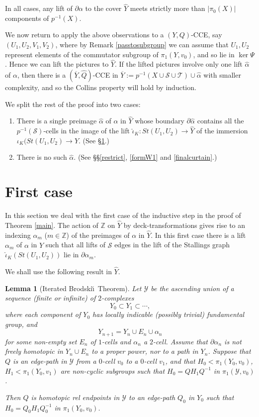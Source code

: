 \documentclass[12pt,a4paper]{amsart}
\def\Z{\mathbb{Z}}
\def\ol{\overline}
\def\wh{\widehat}
\def\a{\alpha}
\def\cS{\mathcal{S}}
\def\cT{\mathcal{T}}
\newtheorem{lem}[thm]{Lemma}
\begin{document}
  
In all cases, any lift of $\partial\a$ to the cover $\wh Y$ meets strictly more
than $\vert\pi_0(X)\vert$ components of $p^{-1}(X)$. 

\bigskip 
We now return to
apply the above observations to a $(Y,Q)$-CCE, say $(U_1,U_2,V_1,V_2)$,
where by Remark \ref{passtosubgroup} we can assume that $U_1,U_2$ 
represent elements of the commutator subgroup of $\pi_1(Y,v_0)$,
and so  lie in $\ker\Psi$.  
Hence we can 
 lift the pictures to $\wh Y$.  If
the lifted pictures involve only one lift $\wh\a$ of $\alpha$, 
then there is a $(\ol Y, \wh Q)$-CCE  in $\ol{Y}:=p^{-1}(X\cup\cS\cup\cT)\cup\wh\a$ with smaller complexity, and so the Collins 
property will hold by induction. 

 We split the rest of the proof into two cases:
\begin{enumerate}
\item There is a single preimage $\wh\a$ of $\a$ in $\wh Y$ whose boundary $\partial\wh\a$ contains all the $p^{-1}(\cS)$-cells in the image of the lift $\wh\iota_K:St(U_1,U_2)\to\wh Y$ of the immersion $\iota_K(St(U_1,U_2)\to Y$.  (See \S \ref{first}.)
\item There is no such $\wh\a$. (See \S\S \ref{restrict}, \ref{formW1} and \ref{finalcurtain}.)
\end{enumerate}


\section{First case}\label{first}

In this section we deal with the 
 first case of the inductive step in the proof of Theorem \ref{main}.
The action of $\Z$ on $\wh Y$ by deck-transformations 
gives rise to an indexing $\a_m$ ($m\in\Z$) of the preimages of $\a$ in $\wh{Y}$.  
In this first case
there is a lift $\a_m$ of  $\alpha$ 
in $\wh Y$ such that 
	all lifts of $\cS$ edges in the lift of the Stallings graph $\wh\iota_K(St(U_1,U_2))$
lie in $\partial\a_m$. 

\smallskip

We shall use the following result  
in $\wh Y$.  

\begin{lem}[Iterated Brodski\u\i\ Theorem]\label{itBr} 
	Let $\mathcal Y$ be the ascending union of a sequence (finite or infinite) of $2$-complexes $$Y_0\subset Y_1 \subset\cdots,$$ where each component of $Y_0$ has locally indicable  
(possibly trivial) fundamental group, and $$Y_{n+1}=Y_n\cup E_n\cup\a_n$$ 
	for some non-empty set $E_n$ of $1$-cells and $\a_n$ a $2$-cell.  
	Assume that $\partial\a_n$ is not freely homotopic in $Y_n\cup E_n$ to a proper power, nor to a path in $Y_n$.   
	Suppose that $Q$ is an edge-path in $\mathcal Y$ from a $0$-cell $v_0$ to a $0$-cell $v_1$, 
	and that $H_0<\pi_1(Y_0,v_0)$, 
	$H_1< \pi_1(Y_0,v_1)$ are non-cyclic subgroups such that $H_0=Q H_1 Q^{-1}$ in $\pi_1(\mathcal Y,v_0)$. 
	
	Then $Q$ is homotopic rel endpoints in $\mathcal Y$ to an edge-path $Q_0$ in $Y_0$
	 such that $H_0=Q_0 H_1 Q_0^{-1}$ in $\pi_1(Y_0,v_0)$.
\end{lem}
\end{document}
